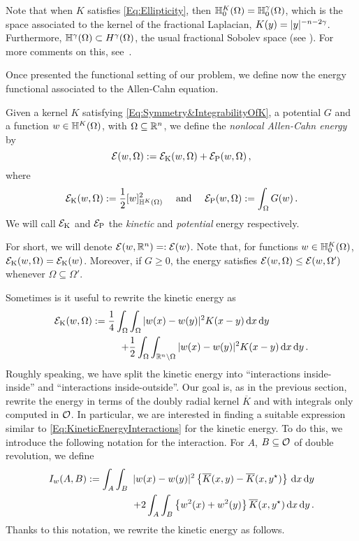 Note that when $K$ satisfies \eqref{Eq:Ellipticity}, then $\mathbb{H}^K_0 (\Omega) = \mathbb{H}^\gamma_0 (\Omega)$,
which is the space associated to the kernel of the fractional Laplacian, $K(y) = |y|^{-n-2\gamma}$.
Furthermore, $\mathbb{H}^\gamma(\Omega) \subset H^\gamma(\Omega)$, the usual fractional Sobolev space (see
\cite{HitchhikerGuide}).  For more comments on this, see~\cite{CozziPassalacqua}.

Once presented the functional setting of our problem, we define now  the energy functional associated to the Allen-Cahn equation. 

\begin{definition}
	Given a kernel $K$ satisfying \eqref{Eq:Symmetry&IntegrabilityOfK}, a potential $G$ and a function $w\in \mathbb{H}^K(\Omega)$, with $\Omega\subseteq \mathbb{R}^{n}$, we define the \emph{nonlocal Allen-Cahn energy} by
	$$
	\mathcal{E}(w, \Omega) := \mathcal{E}_\mathrm{K}(w,\Omega) + \mathcal{E}_\mathrm{P}(w,\Omega)\,,
	$$
	where
	$$
	\mathcal{E}_\mathrm{K}(w, \Omega) := \dfrac{1}{2} [w]^2_{\mathbb{H}^K(\Omega)} \quad \text{ and } \quad  \mathcal{E}_\mathrm{P}(w, \Omega) := \int_{\Omega} G(w)
	\,.
	$$
	We will call $\mathcal{E}_\mathrm{K}$ and $\mathcal{E}_\mathrm{P}$ the \emph{kinetic} and \emph{potential} energy respectively.
\end{definition}


For short, we will denote $\mathcal{E}(w, \mathbb{R}^n) =: \mathcal{E}(w)$. Note that, for functions $w\in \mathbb{H}^K_0(\Omega)$, $\mathcal{E}_\mathrm{K}(w,\Omega) = \mathcal{E}_\mathrm{K}(w)$. Moreover, if $G\geq 0$, the energy satisfies $
\mathcal{E}(w, \Omega) \leq \mathcal{E}(w, \Omega')$  whenever $ \Omega \subseteq \Omega'$.

Sometimes is it useful to rewrite the kinetic energy as
\begin{equation}
	\label{Eq:KineticEnergyInteractions}
	\begin{split}
	\mathcal{E}_\mathrm{K}(w, \Omega) := \dfrac{1}{4} \int_\Omega \int_\Omega |w(x) - w(y)|^2 K(x-y) \,\mathrm{d} x \,\mathrm{d} y \qquad \qquad \\
	+ \dfrac{1}{2} \int_\Omega \int_{\mathbb{R}^n \setminus \Omega} |w(x) - w(y)|^2 K(x-y) \,\mathrm{d} x \,\mathrm{d} y\,.
	\end{split}	
\end{equation}
Roughly speaking, we have split the kinetic energy into ``interactions inside-inside'' and ``interactions inside-outside''. Our goal is, as in the previous section, rewrite the energy in terms of the doubly radial kernel $\overline{K}$ and with integrals only computed in $\mathcal{O}$. In particular, we are interested in finding a suitable expression similar to \eqref{Eq:KineticEnergyInteractions} for the kinetic energy. To do this, we introduce the following notation for the interaction. For $A$, $B\subseteq \mathcal{O}$ of double revolution, we define
\begin{equation}
	\label{Eq:DefIw}
	\begin{split}
	I_w(A,B) := \int_A  \int_B  \ |w(x)-w(y)|^2 \left\{ \overline{K}(x,y) - \overline{K}(x,y^\star) \right\} \,\mathrm{d} x \,\mathrm{d} y  \\
	+2 \int_A  \int_B  \left\{w^2(x)+w^2(y)\right\} \overline{K}(x,y^\star) \,\mathrm{d} x \,\mathrm{d} y\,.
	\end{split}
\end{equation}
Thanks to this notation, we rewrite the kinetic energy as follows.


